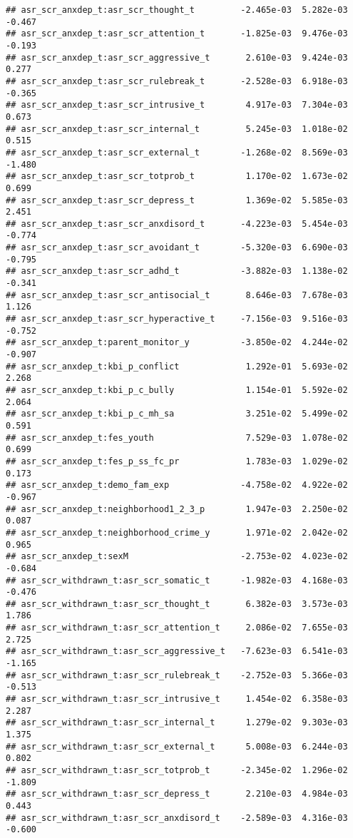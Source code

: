 \documentclass[
]{article}
\begin{document}
\begin{verbatim}
## asr_scr_anxdep_t:asr_scr_thought_t         -2.465e-03  5.282e-03  -0.467
## asr_scr_anxdep_t:asr_scr_attention_t       -1.825e-03  9.476e-03  -0.193
## asr_scr_anxdep_t:asr_scr_aggressive_t       2.610e-03  9.424e-03   0.277
## asr_scr_anxdep_t:asr_scr_rulebreak_t       -2.528e-03  6.918e-03  -0.365
## asr_scr_anxdep_t:asr_scr_intrusive_t        4.917e-03  7.304e-03   0.673
## asr_scr_anxdep_t:asr_scr_internal_t         5.245e-03  1.018e-02   0.515
## asr_scr_anxdep_t:asr_scr_external_t        -1.268e-02  8.569e-03  -1.480
## asr_scr_anxdep_t:asr_scr_totprob_t          1.170e-02  1.673e-02   0.699
## asr_scr_anxdep_t:asr_scr_depress_t          1.369e-02  5.585e-03   2.451
## asr_scr_anxdep_t:asr_scr_anxdisord_t       -4.223e-03  5.454e-03  -0.774
## asr_scr_anxdep_t:asr_scr_avoidant_t        -5.320e-03  6.690e-03  -0.795
## asr_scr_anxdep_t:asr_scr_adhd_t            -3.882e-03  1.138e-02  -0.341
## asr_scr_anxdep_t:asr_scr_antisocial_t       8.646e-03  7.678e-03   1.126
## asr_scr_anxdep_t:asr_scr_hyperactive_t     -7.156e-03  9.516e-03  -0.752
## asr_scr_anxdep_t:parent_monitor_y          -3.850e-02  4.244e-02  -0.907
## asr_scr_anxdep_t:kbi_p_conflict             1.292e-01  5.693e-02   2.268
## asr_scr_anxdep_t:kbi_p_c_bully              1.154e-01  5.592e-02   2.064
## asr_scr_anxdep_t:kbi_p_c_mh_sa              3.251e-02  5.499e-02   0.591
## asr_scr_anxdep_t:fes_youth                  7.529e-03  1.078e-02   0.699
## asr_scr_anxdep_t:fes_p_ss_fc_pr             1.783e-03  1.029e-02   0.173
## asr_scr_anxdep_t:demo_fam_exp              -4.758e-02  4.922e-02  -0.967
## asr_scr_anxdep_t:neighborhood1_2_3_p        1.947e-03  2.250e-02   0.087
## asr_scr_anxdep_t:neighborhood_crime_y       1.971e-02  2.042e-02   0.965
## asr_scr_anxdep_t:sexM                      -2.753e-02  4.023e-02  -0.684
## asr_scr_withdrawn_t:asr_scr_somatic_t      -1.982e-03  4.168e-03  -0.476
## asr_scr_withdrawn_t:asr_scr_thought_t       6.382e-03  3.573e-03   1.786
## asr_scr_withdrawn_t:asr_scr_attention_t     2.086e-02  7.655e-03   2.725
## asr_scr_withdrawn_t:asr_scr_aggressive_t   -7.623e-03  6.541e-03  -1.165
## asr_scr_withdrawn_t:asr_scr_rulebreak_t    -2.752e-03  5.366e-03  -0.513
## asr_scr_withdrawn_t:asr_scr_intrusive_t     1.454e-02  6.358e-03   2.287
## asr_scr_withdrawn_t:asr_scr_internal_t      1.279e-02  9.303e-03   1.375
## asr_scr_withdrawn_t:asr_scr_external_t      5.008e-03  6.244e-03   0.802
## asr_scr_withdrawn_t:asr_scr_totprob_t      -2.345e-02  1.296e-02  -1.809
## asr_scr_withdrawn_t:asr_scr_depress_t       2.210e-03  4.984e-03   0.443
## asr_scr_withdrawn_t:asr_scr_anxdisord_t    -2.589e-03  4.316e-03  -0.600

\end{verbatim}
\end{document}
